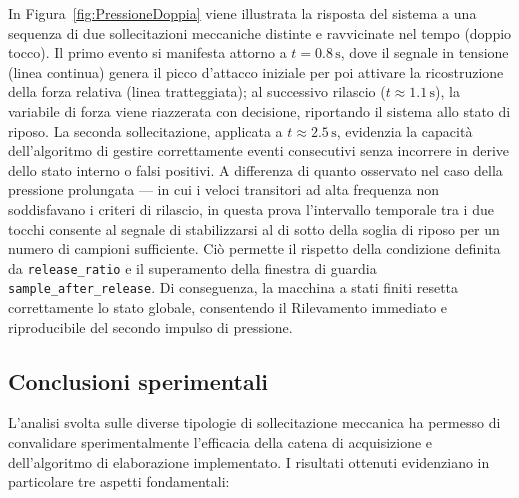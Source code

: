 \documentclass[10pt, a4paper]{article}
\begin{document}
                In Figura~\ref{fig:PressioneDoppia} viene illustrata la risposta del sistema a una sequenza di due sollecitazioni meccaniche distinte e ravvicinate 
                nel tempo (doppio tocco). Il primo evento si manifesta attorno a $t = 0.8\,\mathrm{s}$, dove il segnale in tensione (linea continua) genera il picco 
                d'attacco iniziale per poi attivare la ricostruzione della forza relativa (linea tratteggiata); al successivo rilascio ($t \approx 1.1\,\mathrm{s}$), 
                la variabile di forza viene riazzerata con decisione, riportando il sistema allo stato di riposo.
                La seconda sollecitazione, applicata a $t \approx 2.5\,\mathrm{s}$, evidenzia la capacità dell'algoritmo di gestire correttamente eventi consecutivi 
                senza incorrere in derive dello stato interno o falsi positivi. A differenza di quanto osservato nel caso della pressione prolungata — in cui i veloci 
                transitori ad alta frequenza non soddisfavano i criteri di rilascio, in questa prova l'intervallo temporale tra i due tocchi consente al segnale di 
                stabilizzarsi al di sotto della soglia di riposo per un numero di campioni sufficiente. Ciò permette il rispetto della condizione definita da 
                \texttt{release\_ratio} e il superamento della finestra di guardia \texttt{sample\_after\_release}. Di conseguenza, la macchina a stati finiti 
                resetta correttamente lo stato globale, consentendo il Rilevamento immediato e riproducibile del secondo impulso di pressione.
                \vspace{0.5cm}

        \subsection{Conclusioni sperimentali}       
            L'analisi svolta sulle diverse tipologie di sollecitazione meccanica ha permesso di convalidare sperimentalmente l'efficacia della catena di 
            acquisizione e dell'algoritmo di elaborazione implementato. I risultati ottenuti evidenziano in particolare tre aspetti fondamentali:
\end{document}
